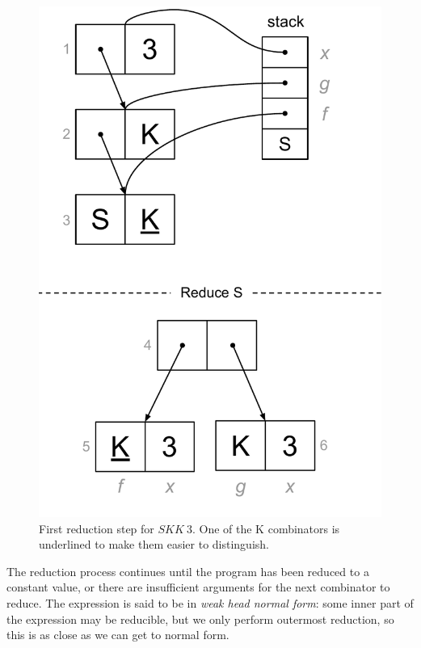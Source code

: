 \documentclass[conference]{IEEEtran}
\begin{document}
\begin{figure}
    \includegraphics[width=.8\columnwidth]{skk3_sred}
    \centering
    \caption{
        First reduction step for $SKK \ 3$.
        One of the K combinators is underlined to make them easier to distinguish.
    }
    \label{fig:skk3_sred}
\end{figure}

The reduction process continues until the program has been reduced to a constant value, or there are insufficient arguments for the next combinator to reduce.
The expression is said to be in \textit{weak head normal form}: some inner part of the expression may be reducible, but we only perform outermost reduction, so this is as close as we can get to normal form.
\end{document}
